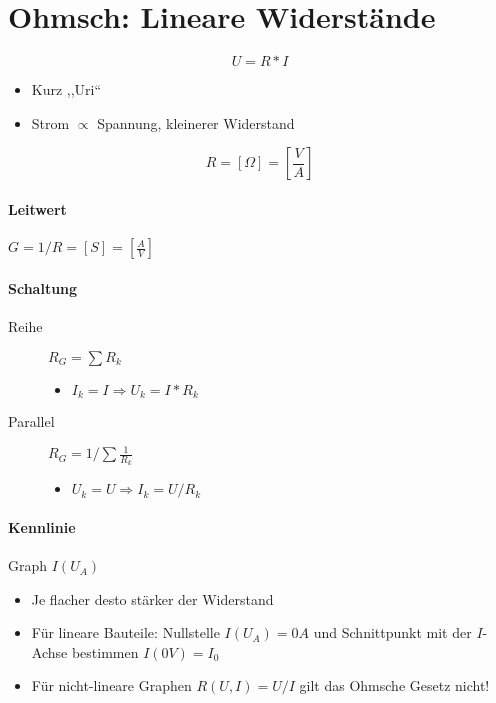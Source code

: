 \section{Ohmsch: Lineare Widerstände}

$$U = R * I$$

\begin{itemize}
  \item Kurz ,,Uri``
  \item Strom $\propto$ Spannung, kleinerer Widerstand
\end{itemize}

$$R = [\Omega] = \left[\frac{V}{A}\right]$$

\paragraph{Leitwert} $G = 1/R = [S] = \left[\frac{A}{V}\right]$

\paragraph{Schaltung}

\begin{description}
  \item[Reihe] $R_G = \sum R_k$
    \begin{itemize}
      \item $I_k = I \Rightarrow U_k = I * R_k$
    \end{itemize}

  \item[Parallel] $R_G = 1 / \sum \frac{1}{R_k}$
    \begin{itemize}
      \item $U_k = U \Rightarrow I_k = U/R_k$
    \end{itemize}
\end{description}

\paragraph{Kennlinie} Graph $I(U_A)$

\begin{itemize}
  \item Je flacher desto stärker der Widerstand
  \item Für lineare Bauteile: Nullstelle $I(U_A) = 0A$ und Schnittpunkt mit der $I$-Achse bestimmen $I(0V) = I_0$
  \item Für nicht-lineare Graphen $R(U, I) = U/I$ gilt das Ohmsche Gesetz nicht!
\end{itemize}

